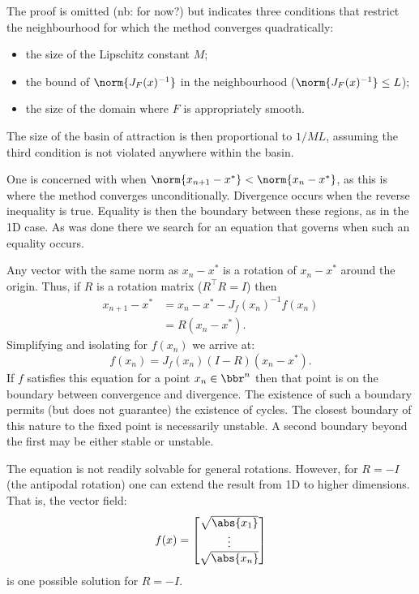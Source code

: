 \documentclass{article}
\begin{document}

The proof is omitted (nb: for now?) but indicates three conditions that restrict the neighbourhood for which the method converges quadratically:
\begin{itemize}
	\item the size of the Lipschitz constant $M$;
	\item the bound of $\norm{J_F(x)^{-1}}$ in the neighbourhood ($\norm{J_F(x)^{-1}} \leq L$);
	\item the size of the domain where $F$ is appropriately smooth.
\end{itemize}
The size of the basin of attraction is then proportional to $1/M L$, assuming the third condition is not violated anywhere within the basin.

One is concerned with when $\norm{x_{n+1} - x^*} < \norm{x_n - x^*}$, as this is where the method converges unconditionally.
Divergence occurs when the reverse inequality is true.
Equality is then the boundary between these regions, as in the 1D case.
As was done there we search for an equation that governs when such an equality occurs.

Any vector with the same norm as $x_n - x^*$ is a rotation of $x_n - x^*$ around the origin.
Thus, if $R$ is a rotation matrix ($R^\top R = I$) then
\begin{align*}
	x_{n+1} - x^* & = x_n - x^* - J_f(x_n)^{-1} f(x_n) \\
				  & = R ( x_n - x^* ).
\end{align*}
Simplifying and isolating for $f(x_n)$ we arrive at:
\begin{equation} \label{eq:NRgov}
f(x_n) = J_f(x_n) (I - R) (x_n - x^*).
\end{equation}
If $f$ satisfies this equation for a point $x_n \in \bbr^n$ then that point is on the boundary between convergence and divergence.
The existence of such a boundary permits (but does not guarantee) the existence of cycles.
The closest boundary of this nature to the fixed point is necessarily unstable.
A second boundary beyond the first may be either stable or unstable.

The equation is not readily solvable for general rotations.
However, for $R = -I$ (the antipodal rotation) one can extend the result from 1D to higher dimensions.
That is, the vector field:
\begin{equation*}
	f(x) = \begin{bmatrix}
	\sqrt{\abs{x_1}} \\ \vdots \\ \sqrt{\abs{x_n}}
	\end{bmatrix}
\end{equation*}
is one possible solution for $R = -I$.
\end{document}
